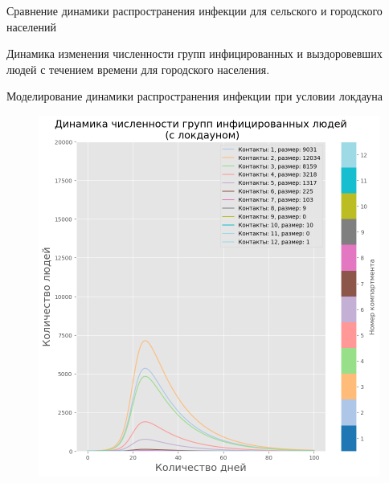 \documentclass[10pt, unicode, xcolor={svgnames, table, hyperref}]{beamer}
\begin{document}
\begin{frame}{Сравнение динамики распространения инфекции для сельского и городского населений}
\begin{figure}[h!]
\begin{minipage}{0.49\textwidth}
		\end{minipage}
	\end{figure}
	Динамика изменения численности групп инфицированных и выздоровевших людей с течением времени для городского населения.
	
\end{frame}


\begin{frame}{Моделирование динамики распространения инфекции при условии локдауна}
	
	\begin{figure}[h!]
		\begin{minipage}{0.49\textwidth}
			\centering
			\includegraphics[width=1.0\textwidth]{img/sir_model_lockdown_urban_I_new.png}
		\end{minipage}
		\begin{minipage}{0.49\textwidth}
			\centering

\end{minipage}
\end{figure}
\end{frame}
\end{document}
